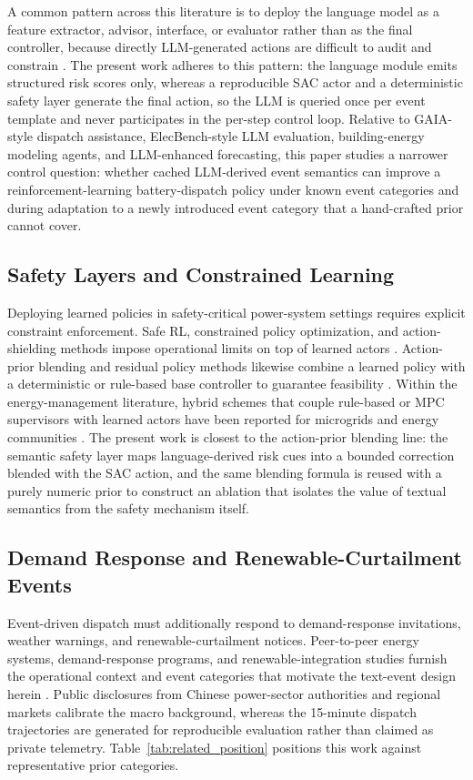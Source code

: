 \documentclass{ieeeaccess}
\begin{document}
A common pattern across this literature is to deploy the language model as a feature extractor, advisor, interface, or evaluator rather than as the final controller, because directly LLM-generated actions are difficult to audit and constrain \cite{b4,b6,b38,b42}. The present work adheres to this pattern: the language module emits structured risk scores only, whereas a reproducible SAC actor and a deterministic safety layer generate the final action, so the LLM is queried once per event template and never participates in the per-step control loop. Relative to GAIA-style dispatch assistance, ElecBench-style LLM evaluation, building-energy modeling agents, and LLM-enhanced forecasting, this paper studies a narrower control question: whether cached LLM-derived event semantics can improve a reinforcement-learning battery-dispatch policy under known event categories and during adaptation to a newly introduced event category that a hand-crafted prior cannot cover.

\subsection{Safety Layers and Constrained Learning}
Deploying learned policies in safety-critical power-system settings requires explicit constraint enforcement. Safe RL, constrained policy optimization, and action-shielding methods impose operational limits on top of learned actors \cite{b23,b24,b25,b26}. Action-prior blending and residual policy methods likewise combine a learned policy with a deterministic or rule-based base controller to guarantee feasibility \cite{b27,b28,b29}. Within the energy-management literature, hybrid schemes that couple rule-based or MPC supervisors with learned actors have been reported for microgrids and energy communities \cite{b8,b30,b31}. The present work is closest to the action-prior blending line: the semantic safety layer maps language-derived risk cues into a bounded correction blended with the SAC action, and the same blending formula is reused with a purely numeric prior to construct an ablation that isolates the value of textual semantics from the safety mechanism itself.

\subsection{Demand Response and Renewable-Curtailment Events}
Event-driven dispatch must additionally respond to demand-response invitations, weather warnings, and renewable-curtailment notices. Peer-to-peer energy systems, demand-response programs, and renewable-integration studies furnish the operational context and event categories that motivate the text-event design herein \cite{b8,b32,b33,b34,b35}. Public disclosures from Chinese power-sector authorities and regional markets calibrate the macro background, whereas the 15-minute dispatch trajectories are generated for reproducible evaluation rather than claimed as private telemetry. Table~\ref{tab:related_position} positions this work against representative prior categories.
\end{document}
